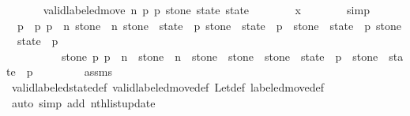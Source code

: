 \begin{isabellebody}
\ \ \ \ \isamarkupfalse%
\ {\isacharasterisk}{\isacharasterisk}{\isacharcolon}\ {\isachardoublequoteopen}valid{\isacharunderscore}labeled{\isacharunderscore}move{\isacharprime}\ n\ p{}{\isacharprime}\ p{}{\isacharprime}\ stone{\isacharprime}\ state\ state{\isacharprime}{\isachardoublequoteclose}\isanewline
\ \ \ \ \ \ \isamarkupfalse%
\ x\isanewline
\ \ \ \ \ \ \isamarkupfalse%
\ simp\isanewline
\ \ \ \ \isamarkupfalse%
\ {\isacharasterisk}{\isacharcolon}\ {\isachardoublequoteopen}p{}\ {\isacharless}\ p{}{\isachardoublequoteclose}\ {\isachardoublequoteopen}p{}\ {\isasymle}\ n{\isachardoublequoteclose}\ {\isachardoublequoteopen}stone\ {\isacharless}\ n{\isachardoublequoteclose}\ {\isachardoublequoteopen}stone\ {\isasymin}\ state\ {\isacharbang}\ p{}{\isachardoublequoteclose}\ {\isachardoublequoteopen}stone\ {\isasymnotin}\ state{\isacharprime}\ {\isacharbang}\ p{}{\isachardoublequoteclose}\ \ {\isachardoublequoteopen}stone\ {\isasymnotin}\ state\ {\isacharbang}\ p{}{\isachardoublequoteclose}\ {\isachardoublequoteopen}stone\ {\isasymin}\ state{\isacharprime}\ {\isacharbang}\ p{}{\isachardoublequoteclose}\ \isanewline
\ \ \ \ \ \ \ \ \ {\isachardoublequoteopen}{\isasymforall}\ stone{\isacharprime}{\isacharprime}\ p{\isachardot}\ p\ {\isasymle}\ n\ {\isasymand}\ stone{\isacharprime}{\isacharprime}\ {\isacharless}\ n\ {\isasymand}\ stone{\isacharprime}{\isacharprime}\ {\isasymnoteq}\ stone\ {\isasymlongrightarrow}\ {\isacharparenleft}stone{\isacharprime}{\isacharprime}\ {\isasymin}\ state\ {\isacharbang}\ p\ {\isasymlongleftrightarrow}\ stone{\isacharprime}{\isacharprime}\ {\isasymin}\ state{\isacharprime}\ {\isacharbang}\ p{\isacharparenright}{\isachardoublequoteclose}\isanewline
\ \ \ \ \ \ \isamarkupfalse%
\ {\isacharasterisk}\ assms{\isacharparenleft}{}{\isacharparenright}\isanewline
\ \ \ \ \ \ \isamarkupfalse%
\ valid{\isacharunderscore}labeled{\isacharunderscore}state{\isacharunderscore}def\ valid{\isacharunderscore}labeled{\isacharunderscore}move{\isacharprime}{\isacharunderscore}def\ Let{\isacharunderscore}def\ labeled{\isacharunderscore}move{\isacharunderscore}def\isanewline
\ \ \ \ \ \ \isamarkupfalse%
\ {\isacharparenleft}auto\ simp\ add{\isacharcolon}\ nth{\isacharunderscore}list{\isacharunderscore}update{\isacharparenright}\isanewline
\isanewline
\ \ \ \ \isamarkupfalse%

\end{isabellebody}
